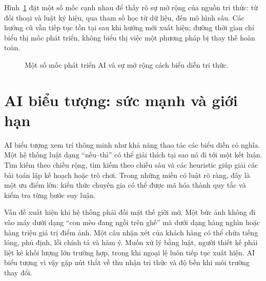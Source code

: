 \documentclass[12pt,a4paper]{report}
\begin{document}
Hình~\ref{fig:essay03-ai-timeline} đặt một số mốc cạnh nhau để thấy rõ sự mở rộng của nguồn tri thức: từ đối thoại và luật ký hiệu, qua tham số học từ dữ liệu, đến mô hình sâu. Các hướng cũ vẫn tiếp tục tồn tại sau khi hướng mới xuất hiện; đường thời gian chỉ biểu thị mốc phát triển, không biểu thị việc một phương pháp bị thay thế hoàn toàn.
\begin{figure}[htbp]\centering
{}
\caption{Một số mốc phát triển AI và sự mở rộng cách biểu diễn tri thức.}\label{fig:essay03-ai-timeline}
\end{figure}

\section{AI biểu tượng: sức mạnh và giới hạn}
AI biểu tượng xem trí thông minh như khả năng thao tác các biểu diễn có nghĩa. Một hệ thống luật dạng ``nếu--thì'' có thể giải thích tại sao nó đi tới một kết luận. Tìm kiếm theo chiều rộng, tìm kiếm theo chiều sâu và các heuristic giúp giải các bài toán lập kế hoạch hoặc trò chơi. Trong những miền có luật rõ ràng, đây là một ưu điểm lớn: kiến thức chuyên gia có thể được mã hóa thành quy tắc và kiểm tra từng bước suy luận.

Vấn đề xuất hiện khi hệ thống phải đối mặt thế giới mở. Một bức ảnh không đi vào máy dưới dạng ``con mèo đang ngồi trên ghế'' mà dưới dạng hàng nghìn hoặc hàng triệu giá trị điểm ảnh. Một câu nhận xét của khách hàng có thể chứa tiếng lóng, phủ định, lỗi chính tả và hàm ý. Muốn xử lý bằng luật, người thiết kế phải liệt kê khối lượng lớn trường hợp, trong khi ngoại lệ luôn tiếp tục xuất hiện. AI biểu tượng vì vậy gặp nút thắt về thu nhận tri thức và độ bền khi môi trường thay đổi.
\end{document}
